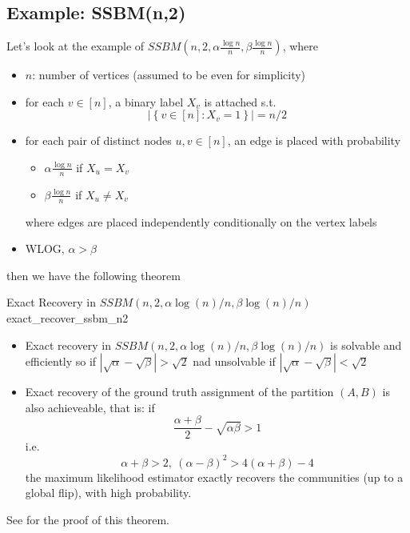 \documentclass[twoside]{article}
\begin{document}
\subsection{Example: SSBM(n,2)}
Let's look at the example of $SSBM(n,2,\alpha\frac{\log n}{n},\beta \frac{\log n}{n})$, where 
\begin{itemize}
    \item $n$: number of vertices (assumed to be even for simplicity)
    \item for each $v\in [n]$, a binary label $X_v$ is attached s.t. $$ \left\vert \left\{ v\in [n]: X_v =1 \right\} \right\vert = n/2 $$
    \item for each pair of distinct nodes $u,v\in[n]$, an edge is placed with probability
    \begin{itemize}
        \item $\alpha \frac{\log n}{n}$ if $X_u=X_v$
        \item $\beta\frac{\log n}{n}$ if $X_u \neq X_v$
    \end{itemize}
    where edges are placed independently conditionally on the vertex labels
    \item WLOG, $\alpha > \beta$
\end{itemize}
then we have the following theorem 
\begin{theorem}{Exact Recovery in $SSBM(n,2,\alpha \log (n)/n,\beta \log(n)/n)$}{exact_recover_ssbm_n2}
    \begin{itemize}
        \item Exact recovery in $SSBM(n,2,\alpha \log (n)/n,\beta \log(n)/n)$ is solvable and efficiently so if $\left\vert \sqrt{\alpha} -\sqrt{\beta} \right\vert > \sqrt{2}$ nad unsolvable if $\left\vert \sqrt{\alpha} -\sqrt{\beta} \right\vert < \sqrt{2}$
        \item Exact recovery of the ground truth assignment of the partition $(A,B)$ is also achieveable, that is: if 
        $$ \frac{\alpha+\beta}{2} - \sqrt{\alpha\beta} >1 $$
        i.e. 
        $$ \alpha+\beta >2,\ \left(\alpha-\beta\right)^2 > 4\left(\alpha+\beta\right) - 4 $$
        the maximum likelihood estimator exactly recovers the communities (up to a global flip), with high probability.
    \end{itemize}
\end{theorem}
See \citet{abbe2017community} for the proof of this theorem. 
\end{document}
